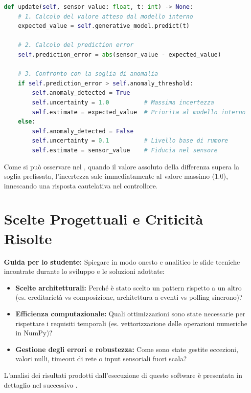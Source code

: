 \begin{lstlisting}[language=Python, caption={Logica di aggiornamento percettivo nel \texttt{BeliefState}.}, label={lst:belief-update}]
def update(self, sensor_value: float, t: int) -> None:
    # 1. Calcolo del valore atteso dal modello interno
    expected_value = self.generative_model.predict(t)
    
    # 2. Calcolo del prediction error
    self.prediction_error = abs(sensor_value - expected_value)
    
    # 3. Confronto con la soglia di anomalia
    if self.prediction_error > self.anomaly_threshold:
        self.anomaly_detected = True
        self.uncertainty = 1.0          # Massima incertezza
        self.estimate = expected_value  # Priorita al modello interno
    else:
        self.anomaly_detected = False
        self.uncertainty = 0.1          # Livello base di rumore
        self.estimate = sensor_value    # Fiducia nel sensore
\end{lstlisting}

Come si può osservare nel , quando il valore assoluto della differenza supera la soglia prefissata, l'incertezza sale immediatamente al valore massimo ($1.0$), innescando una risposta cautelativa nel controllore.


\section{Scelte Progettuali e Criticità Risolte}
\label{sec:scelte-criticita}

\textbf{Guida per lo studente:} Spiegare in modo onesto e analitico le sfide tecniche incontrate durante lo sviluppo e le soluzioni adottate:
\begin{itemize}
    \item \textbf{Scelte architetturali:} Perché è stato scelto un pattern rispetto a un altro (es. ereditarietà vs composizione, architettura a eventi vs polling sincrono)?
    \item \textbf{Efficienza computazionale:} Quali ottimizzazioni sono state necessarie per rispettare i requisiti temporali (es. vettorizzazione delle operazioni numeriche in NumPy)?
    \item \textbf{Gestione degli errori e robustezza:} Come sono state gestite eccezioni, valori nulli, timeout di rete o input sensoriali fuori scala?
\end{itemize}

L'analisi dei risultati prodotti dall'esecuzione di questo software è presentata in dettaglio nel successivo .
